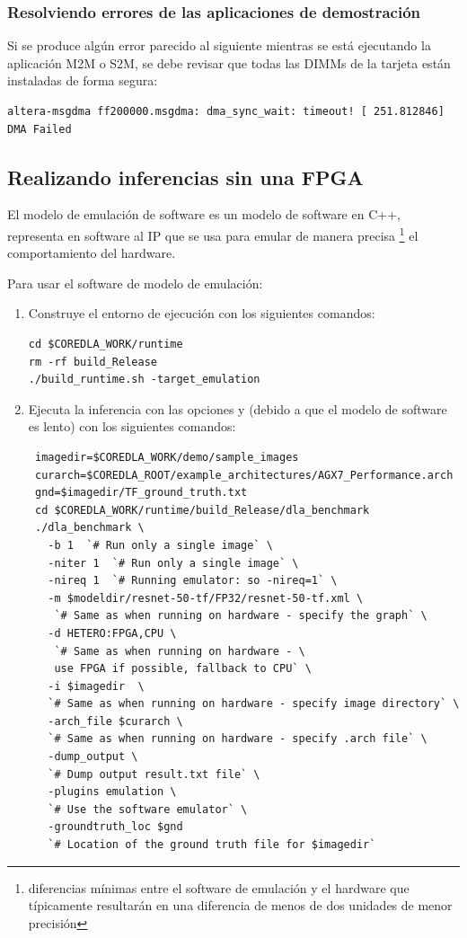 \subsubsection{Resolviendo errores de las aplicaciones de demostraci\'on}

    Si se produce alg\'un error parecido al siguiente mientras se est\'a ejecutando la aplicaci\'on M2M o S2M, se debe revisar que todas las DIMMs de la tarjeta est\'an instaladas de forma segura:
    \begin{lstlisting}
altera-msgdma ff200000.msgdma: dma_sync_wait: timeout! [ 251.812846] DMA Failed\end{lstlisting}

\subsection{Realizando inferencias sin una FPGA}

    El modelo de emulaci\'on de software es un modelo de software en C++, representa en software al \ais IP que se usa para emular de manera precisa \footnote{diferencias m\'inimas entre el software de emulaci\'on y el hardware que t\'ipicamente resultar\'an en una diferencia de menos de dos unidades de menor precisi\'on} el comportamiento del hardware. 

    Para usar el software de modelo de emulaci\'on:
    \begin{enumerate}
        \item Construye el entorno de ejecuci\'on con los siguientes comandos:
        \begin{lstlisting}
cd $COREDLA_WORK/runtime
rm -rf build_Release
./build_runtime.sh -target_emulation        \end{lstlisting}

        \item Ejecuta la inferencia con las opciones  y  (debido a que el modelo de software es lento) con los siguientes comandos:
        \begin{lstlisting}
 imagedir=$COREDLA_WORK/demo/sample_images
 curarch=$COREDLA_ROOT/example_architectures/AGX7_Performance.arch
 gnd=$imagedir/TF_ground_truth.txt
 cd $COREDLA_WORK/runtime/build_Release/dla_benchmark
 ./dla_benchmark \
   -b 1  `# Run only a single image` \
   -niter 1  `# Run only a single image` \
   -nireq 1  `# Running emulator: so -nireq=1` \
   -m $modeldir/resnet-50-tf/FP32/resnet-50-tf.xml \
    `# Same as when running on hardware - specify the graph` \
   -d HETERO:FPGA,CPU \
    `# Same as when running on hardware - \
    use FPGA if possible, fallback to CPU` \
   -i $imagedir  \
   `# Same as when running on hardware - specify image directory` \
   -arch_file $curarch \
   `# Same as when running on hardware - specify .arch file` \
   -dump_output \
   `# Dump output result.txt file` \
   -plugins emulation \
   `# Use the software emulator` \
   -groundtruth_loc $gnd  
   `# Location of the ground truth file for $imagedir`\end{lstlisting}
    \end{enumerate}

